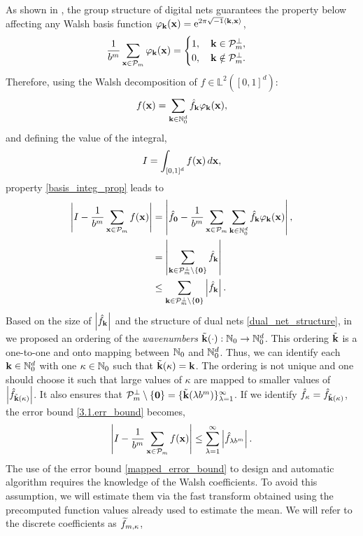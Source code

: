 As shown in \cite[Sec. 3]{HicJim}, the group structure of digital nets guarantees the property below affecting any Walsh basis function $\varphi_{\boldsymbol{\mathbf{k}}}(\boldsymbol{\mathbf{x}})=\text{e}^{2 \pi \sqrt{-1} \left \langle \boldsymbol{\mathbf{k}}, \boldsymbol{\mathbf{x}} \right \rangle_{{}}}$,
\begin{equation}\label{basis_integ_prop}
\frac{1}{b^m}\sum_{\boldsymbol{\mathbf{x}}\in\mathcal{P}_m}\varphi_{\boldsymbol{\mathbf{k}}}(\boldsymbol{\mathbf{x}})=
\begin{cases}
1,\quad \boldsymbol{\mathbf{k}}\in\mathcal{P}_m^\perp, \\
0,\quad \boldsymbol{\mathbf{k}}\notin\mathcal{P}_m^\perp.
\end{cases}
\end{equation}
Therefore, using the Walsh decomposition of $f\in \mathbb{L}^2([0,1]^d)$: \[
f(\boldsymbol{\mathbf{x}})=\sum_{\boldsymbol{\mathbf{k}}\in\mathbb{N}_0^d}\hat{f}_{\boldsymbol{\mathbf{k}}}\varphi_{\boldsymbol{\mathbf{k}}}(\boldsymbol{\mathbf{x}}), \]
and defining the value of the integral,
\[ I = \int_{[0,1]^d} f(\boldsymbol{\mathbf{x}})\,d\boldsymbol{\mathbf{x}},\]
property \eqref{basis_integ_prop} leads to
\begin{align}
\nonumber
\left\lvert I - \frac{1}{b^m}\sum_{\boldsymbol{\mathbf{x}}\in\mathcal{P}_m}f(\boldsymbol{\mathbf{x}})\right\rvert &=
\left\lvert\hat{f}_{\boldsymbol{\mathbf{0}}} - \frac{1}{b^m}\sum_{\boldsymbol{\mathbf{x}}\in\mathcal{P}_m}\sum_{\boldsymbol{\mathbf{k}}\in\mathbb{N}_0^d}\hat{f}_{\boldsymbol{\mathbf{k}}}\varphi_{\boldsymbol{\mathbf{k}}}(\boldsymbol{\mathbf{x}})\right\rvert, \\
\nonumber
&= \left\lvert\sum_{\boldsymbol{\mathbf{k}}\in\mathcal{P}_m^\perp\setminus\{\boldsymbol{\mathbf{0}}\}}\hat{f}_{\boldsymbol{\mathbf{k}}}\right\rvert \\
& \leq \sum_{\boldsymbol{\mathbf{k}}\in\mathcal{P}_m^\perp\setminus\{\boldsymbol{\mathbf{0}}\}}\left\lvert\hat{f}_{\boldsymbol{\mathbf{k}}}\right\rvert. \label{3.1.err_bound}
\end{align}
Based on the size of $\left\lvert\hat{f}_{\boldsymbol{\mathbf{k}}}\right\rvert$ and the structure of dual nets \eqref{dual_net_structure}, in \cite[Sec. 4.1]{HicJim} we proposed an ordering of the \emph{wavenumbers} $\tilde{\boldsymbol{\mathbf{k}}}(\cdot):\mathbb{N}_0\rightarrow\mathbb{N}_0^d$. This ordering $\tilde{\boldsymbol{\mathbf{k}}}$ is a one-to-one and onto mapping between $\mathbb{N}_0$ and $\mathbb{N}_0^d$. Thus, we can identify each $\boldsymbol{\mathbf{k}}\in\mathbb{N}_0^d$ with one $\kappa\in\mathbb{N}_0$ such that $\tilde{\boldsymbol{\mathbf{k}}}(\kappa)=\boldsymbol{\mathbf{k}}$. The ordering is not unique and one should choose it such that large values of $\kappa$ are mapped to smaller values of $\left\lvert\hat{f}_{\tilde{\boldsymbol{\mathbf{k}}}(\kappa)}\right\rvert$. It also ensures that $\mathcal{P}_m^\perp\setminus\{\boldsymbol{\mathbf{0}}\}=\{\tilde{\boldsymbol{\mathbf{k}}}(\lambda b^m)\}_{\lambda=1}^\infty$. If we identify $\hat{f}_{\kappa}=\hat{f}_{\tilde{\boldsymbol{\mathbf{k}}}(\kappa)}$, the error bound \eqref{3.1.err_bound} becomes,
\begin{equation}\label{mapped_error_bound}
\left\lvert I - \frac{1}{b^m}\sum_{\boldsymbol{\mathbf{x}}\in\mathcal{P}_m}f(\boldsymbol{\mathbf{x}})\right\rvert \le \sum_{\lambda=1}^{\infty} \left \lvert \hat{f}_{\lambda b^m}\right \rvert.
\end{equation}
The use of the error bound \eqref{mapped_error_bound} to design and automatic algorithm requires the knowledge of the Walsh coefficients. To avoid this assumption, we will estimate them via the fast transform obtained using the precomputed function values already used to estimate the mean. We will refer to the discrete coefficients as $\widetilde{f}_{m,\kappa}$,
